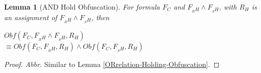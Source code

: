\documentclass[conference]{IEEEtran}
\newtheorem{lemma}{\textbf{Lemma}}
\begin{document}
\begin{lemma}[AND Hold Obfuscation]\label{ANDrelation-Holding-Obfuscation}
For formula $F_C$ and $F_{_RH}\wedge F_{_SH}$, 
with $R_H$ is an assignment of $F_{_RH} \wedge F_{_SH}$, then

$Obf(F_C,F_{_RH} \wedge F_{_SH},R_H) $ \\
$\equiv Obf(F_C,F_{_RH},R_H) \wedge Obf(F_C,F_{_SH} ,R_H)$
\end{lemma}
\begin{proof} 
\textsl{Abbr.}
Similar to Lemma \ref{ORrelation-Holding-Obfuscation}.
% 
% 
\end{proof}
\end{document}
